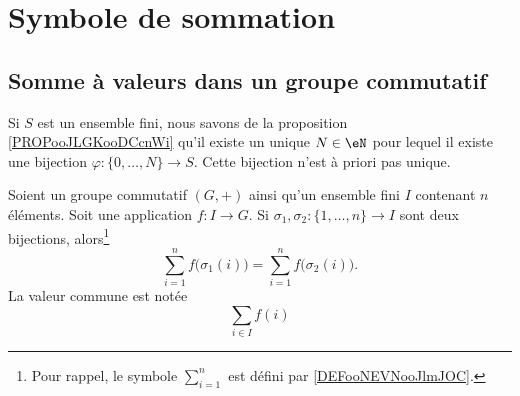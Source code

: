 \section{Symbole de sommation}

\subsection{Somme à valeurs dans un groupe commutatif}

Si \( S\) est un ensemble fini, nous savons de la proposition \ref{PROPooJLGKooDCcnWi} qu'il existe un unique \( N\in \eN\) pour lequel il existe une bijection \( \varphi\colon \{ 0,\ldots, N \}\to S\). Cette bijection n'est à priori pas unique.

\begin{lemmaDef}       \label{DEFooLNEXooYMQjRo}
    Soient un groupe commutatif \( (G,+)\) ainsi qu'un ensemble fini \( I\) contenant \( n\) éléments. Soit une application \( f\colon I\to G \). Si \( \sigma_1,\sigma_2\colon \{1,\ldots, n \}\to I\) sont deux bijections, alors\footnote{Pour rappel, le symbole \( \sum_{i=1}^n\) est défini par \ref{DEFooNEVNooJlmJOC}.}
    \begin{equation}
        \sum_{i=1}^nf\big( \sigma_1(i) \big)=\sum_{i=1}^nf\big( \sigma_2(i) \big).
    \end{equation}
    La valeur commune est notée
    \begin{equation}
        \sum_{i\in I}f(i)
    \end{equation}
\end{lemmaDef}

